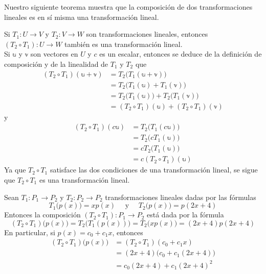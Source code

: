 Nuestro siguiente teorema muestra que la composición de dos transformaciones lineales es en sí misma una transformación lineal.

\begin{theorem}
    Si $T_1: U \longrightarrow V$ y $T_2: V \longrightarrow W$ son transformaciones lineales, entonces $(T_2 \circ T_1): U \longrightarrow W$ también es una transformación lineal. \\
    \demostracion Si $\mathbb{u}$ y $\mathbb{v}$ son vectores en $U$ y $c$ es un escalar, entonces se deduce de la definición de composición y de la linealidad de $T_1$ y $T_2$ que
    \begin{align*}
        (T_2 \circ T_1)(\mathbb{u} + \mathbb{v}) & = T_2\big(T_1(\mathbb{u} + \mathbb{v})\big) \\
        & = T_2\big(T_1(\mathbb{u}) + T_1(\mathbb{v})\big) \\
        & = T_2\big(T_1(\mathbb{u})\big) + T_2\big(T_1(\mathbb{v})\big) \\
        & = (T_2 \circ T_1)(\mathbb{u}) + (T_2 \circ T_1)(\mathbb{v})
    \end{align*}
    y
    \begin{align*}
        (T_2 \circ T_1)(c\mathbb{u}) & =T_2\big(T_1(c\mathbb{u})\big) \\
        & = T_2\big(cT_1(\mathbb{u})\big) \\
        & = cT_2\big(T_1(\mathbb{u})\big) \\
        & = c(T_2 \circ T_1)(\mathbb{u})
    \end{align*}
    Ya que $T_2 \circ T_1$ satisface las dos condiciones de una transformación lineal, se sigue que $T_2 \circ T_1$ es una transformación lineal.
\end{theorem}

\begin{example}
    Sean $T_1: P_1 \longrightarrow P_2$ y $T_2: P_2 \longrightarrow P_2$ transformaciones lineales dadas por las fórmulas
    $$T_1\big(p(x)\big) = xp(x) \quad \text{ y } \quad T_2\big(p(x)\big) = p(2x + 4)$$
    Entonces la composición $(T_2 \circ T_1): P_1 \longrightarrow P_2$ está dada por la fórmula
    $$(T_2 \circ T_1)\big(p(x)\big) = T_2\big(T_1(p(x))\big) = T_2\big(xp(x)\big) = (2x + 4)p(2x + 4)$$
    En particular, si $p(x) = c_0 + c_1x$, entonces
    \begin{align*}
        (T_2 \circ T_1)\big(p(x)\big) & = (T_2 \circ T_1)(c_0 + c_1x) \\
        & = (2x + 4)\big(c_0 + c_1(2x + 4)\big) \\
        & = c_0(2x + 4) + c_1(2x + 4)^2
    \end{align*}
\end{example}

